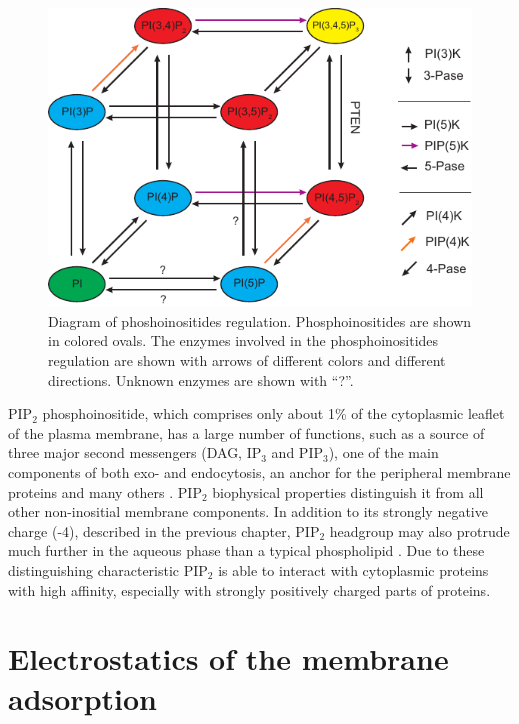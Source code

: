 \begin{figure}[!ht]
\begin{center}
  \includegraphics[scale=1.2]{../figures/PI_cycle2.pdf}
\end{center}
 \caption[Diagram of phoshoinositides regulation]{Diagram of phoshoinositides regulation. Phosphoinositides are shown in colored ovals. The enzymes involved in the phosphoinositides regulation are shown with arrows of different colors and different directions. Unknown enzymes are shown with ``?''.}
\label{fig:PI_cycle2}
\end{figure}

PIP$_2$ phosphoinositide, which comprises only about 1\% of the cytoplasmic leaflet of the plasma membrane, has a large number of functions, such as a source of three major second messengers (DAG, IP$_3$ and PIP$_3$), one of the main components of both exo- and endocytosis, an anchor for the peripheral membrane proteins and many others \cite{Martin2001,Toker1998,Lee1995,Nebl2000}. PIP$_2$ biophysical properties distinguish it from all other non-inositial membrane components. In addition to its strongly negative charge (-4), described in the previous chapter, PIP$_2$ headgroup may also protrude much further in the aqueous phase than a typical phospholipid \cite{Li2009}. Due to these distinguishing characteristic PIP$_2$ is able to interact with cytoplasmic proteins with high affinity, especially with strongly positively charged parts of proteins.

\section{Electrostatics of the membrane adsorption}

